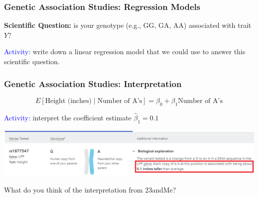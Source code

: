 \documentclass[12pt, 
hyperref={colorlinks=true, linkcolor=blue, urlcolor=cyan},dvipsnames]{beamer}
\begin{document}
\begin{frame}
\frametitle{Genetic Association Studies: Regression Models}

\textbf{Scientific Question:} is your genotype (e.g., GG, GA, AA) associated with trait $Y$? \pause

\textcolor{blue}{Activity:} write down a linear regression model that we could use to answer this scientific question.

\end{frame}

\begin{frame}
\frametitle{Genetic Association Studies: Interpretation}

$$E[\text{Height (inches)} \mid \text{Number of A's}] = \beta_0 + \beta_1 \text{Number of A's}$$

\textcolor{blue}{Activity:} interpret the coefficient estimate $\hat\beta_1 = 0.1$ \pause

\hspace*{-1cm}
\includegraphics[width=1.17\textwidth]{figs/23andMe_interp}

What do you think of the interpretation from 23andMe?

\end{frame}
\end{document}
